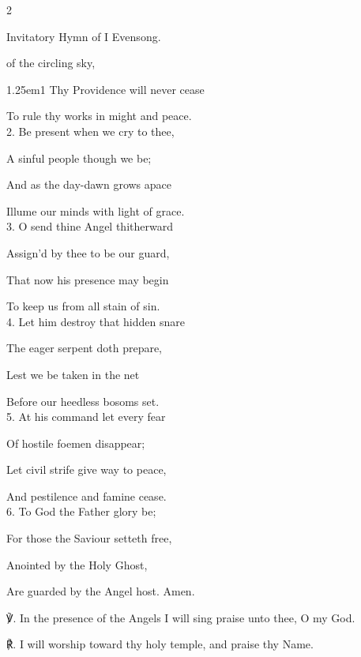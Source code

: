 \begin{paracol}{2}
\begin{rubric}
	Invitatory Hymn of I Evensong.
\end{rubric}

\mattinsOfficeHymn
{} of the circling sky,


\begin{hangparas}{1.25em}{1}
Thy Providence will never cease

To rule thy works in might and peace.\\

2. Be present when we cry to thee,

A sinful people though we be;

And as the day-dawn grows apace

Illume our minds with light of grace.\\

3. O send thine Angel thitherward

Assign'd by thee to be our guard,

That now his presence may begin

To keep us from all stain of sin.\\

4. Let him destroy that hidden snare

The eager serpent doth prepare,

Lest we be taken in the net

Before our heedless bosoms set.\\

5. At his command let every fear

Of hostile foemen disappear;

Let civil strife give way to peace,

And pestilence and famine cease.\\

6. To God the Father glory be;

For those the Saviour setteth free,

Anointed by the Holy Ghost,

Are guarded by the Angel host. Amen.\\
\end{hangparas}

℣. In the presence of the Angels I will sing praise unto thee, O my God.

℟. I will worship toward thy holy temple, and praise thy Name.


\fussy	
\end{paracol}

